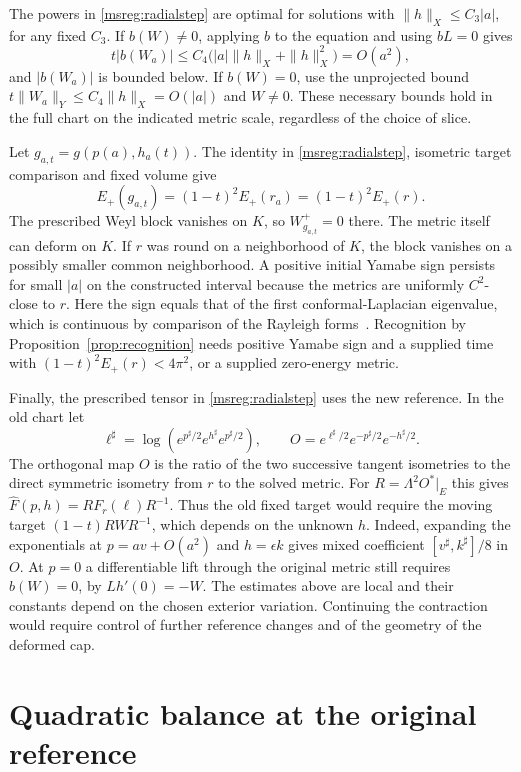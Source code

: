 \documentclass[11pt]{article}
\numberwithin{equation}{section}
\theoremstyle{definition}
\theoremstyle{remark}
\begin{document}
The powers in \eqref{msreg:radialstep} are optimal for solutions
with \(\|h\|_X\le C_3|a|\), for any fixed \(C_3\).
If \(b(W)\ne0\), applying \(b\) to the equation and using
\(bL=0\) gives
\[
 t|b(W_a)|\le C_4\bigl(|a|\|h\|_X+\|h\|_X^2\bigr)=O(a^2),
\]
and \(|b(W_a)|\) is bounded below. If \(b(W)=0\), use the
unprojected bound \(t\|W_a\|_Y\le C_4\|h\|_X=O(|a|)\)
and \(W\ne0\). These necessary bounds hold in the full chart
on the indicated metric scale, regardless of the choice of slice.

Let \(g_{a,t}=g(p(a),h_a(t))\). The identity in
\eqref{msreg:radialstep}, isometric target comparison and fixed
volume give
\[
 E_+(g_{a,t})=(1-t)^2 E_+(r_a)=(1-t)^2 E_+(r).
\]
The prescribed Weyl block vanishes on \(K\), so \(W^+_{g_{a,t}}=0\)
there. The metric itself can deform on \(K\). If \(r\) was
round on a neighborhood of \(K\), the block vanishes on a
possibly smaller common neighborhood. A positive initial
Yamabe sign persists for small \(|a|\) on the constructed
interval because the metrics are uniformly \(C^2\)-close to \(r\).
Here the sign equals that of the first conformal-Laplacian
eigenvalue, which is continuous by comparison of the Rayleigh
forms~\cite[(2.6)--(2.7)]{LeeParker1987Yamabe}.
Recognition by Proposition~\ref{prop:recognition} needs
positive Yamabe sign and a supplied time with
\((1-t)^2E_+(r)<4\pi^2\), or a supplied zero-energy metric.

Finally, the prescribed tensor in \eqref{msreg:radialstep}
uses the new reference. In the old chart let
\[
 \ell^\sharp=\log(e^{p^\sharp/2}e^{h^\sharp}e^{p^\sharp/2}),\qquad
 O=e^{\ell^\sharp/2}e^{-p^\sharp/2}e^{-h^\sharp/2}.
\]
The orthogonal map \(O\) is the ratio of the two successive
tangent isometries to the direct symmetric isometry from \(r\)
to the solved metric. For \(R=\Lambda^2O^*|_E\) this gives
\(\widehat F(p,h)=R F_r(\ell)R^{-1}\). Thus the old fixed
target would require the moving target
\((1-t)RWR^{-1}\), which depends on the unknown \(h\).
Indeed, expanding the exponentials at \(p=av+O(a^2)\) and
\(h=\epsilon k\) gives mixed coefficient
\([v^\sharp,k^\sharp]/8\) in \(O\). At \(p=0\) a differentiable
lift through the original
metric still requires \(b(W)=0\), by
\(Lh'(0)=-W\). The estimates above are local and their constants
depend on the chosen exterior variation. Continuing the
contraction would require control of further reference
changes and of the geometry of the deformed cap.

\section{Quadratic balance at the original reference}\label{mscone:section}
\end{document}
